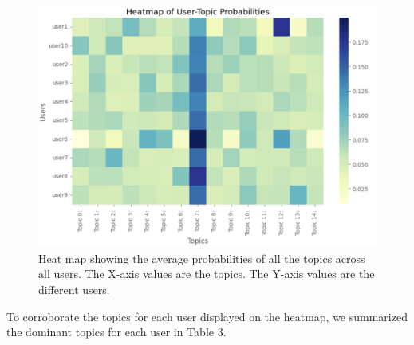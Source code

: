\documentclass[acmtog]{acmart}
\begin{document}
\begin{figure}[ht]
  \centering
  \includegraphics[width=\linewidth]{User-Topic.png}
  \caption{Heat map showing the average probabilities of all the topics across all users. The X-axis values are the topics. The Y-axis values are the different users. 
  \label{fig:user-topic}}
\end{figure}

To corroborate the topics for each user displayed on the heatmap, we summarized the dominant topics for each user in Table 3.
\end{document}

